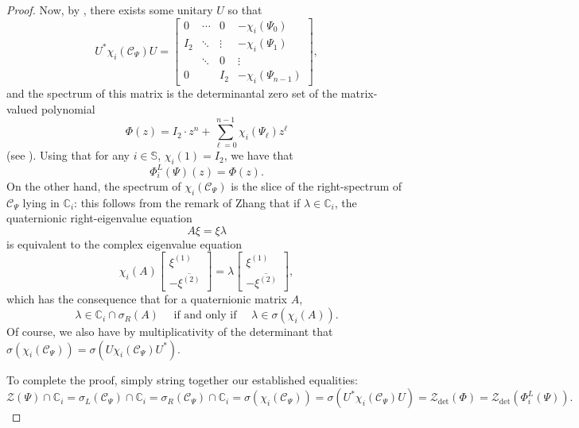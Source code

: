 \documentclass[11pt,reqno]{amsart}
\def\x{\chi}
\def\l{\lambda}
\def\s{\sigma}
\def\P{\Phi}
\def\Q{\Psi}
\def\CC{\mathbb{C}}
\def\SS{\mathbb{S}}
\def\cC{\mathcal{C}}
\def\cZ{\mathcal{Z}}
\theoremstyle{definition}
\numberwithin{equation}{section}
\begin{document}
\begin{proof}
    Now, by , there exists some unitary \(U\) so that 
    \[
        U^* \x_i(\cC_\Q) U = \begin{bmatrix} 0 & \cdots & 0 & -\x_i(\Q_0) \\ I_2 & \ddots & \vdots & -\x_i(\Q_1) \\ & \ddots & 0 & \vdots \\ 0 & & I_2 & -\x_i(\Q_{n-1}) \end{bmatrix},
    \]
    and the spectrum of this matrix is the determinantal zero set of the matrix-valued polynomial
    \[
        \P(z) = I_2 \cdot z^n + \sum_{\ell = 0}^{n-1} \x_i(\Q_\ell) z^\ell
    \]
    (see \cite{GLR09}). Using that for any \(i \in \SS\), \(\x_i(1) = I_2\), we have that
    \[
        \P^L_i(\Q)(z) = \P(z).
    \]
    On the other hand, the spectrum of \(\x_i(\cC_{\Q})\) is the slice of the right-spectrum of \(\cC_\Q\) lying in \(\CC_i\): this follows from the remark of Zhang \cite{Zha97} that if \(\l \in \CC_i\), the quaternionic right-eigenvalue equation
    \[
        A\xi = \xi \l
    \]
    is equivalent to the complex eigenvalue equation
    \[
        \x_i(A) \begin{bmatrix} \xi^{(1)} \\[6pt] - \overline{\xi^{(2)}}\end{bmatrix} = \l \begin{bmatrix} \xi^{(1)} \\[6pt] - \overline{\xi^{(2)}}\end{bmatrix},
    \]
    which has the consequence that for a quaternionic matrix \(A\),
    \[
        \l \in \CC_i \cap \s_R(A) \quad \text{ if and only if } \quad \l \in \s(\x_i(A)).
    \]
    Of course, we also have by multiplicativity of the determinant that \(\s(\x_i(\cC_\Q)) = \s(U \x_i(\cC_\Q) U^*)\).
    
    To complete the proof, simply string together our established equalities:
    \[
        \cZ(\Q) \cap \CC_i = \s_L(\cC_\Q) \cap \CC_i = \s_R(\cC_\Q) \cap \CC_i = \s(\x_i(\cC_\Q)) = \s(U^* \x_i(\cC_\Q) U) = \cZ_{\det}(\P) = \cZ_{\det}(\P^L_i(\Q)).
    \]
\end{proof}
\end{document}
